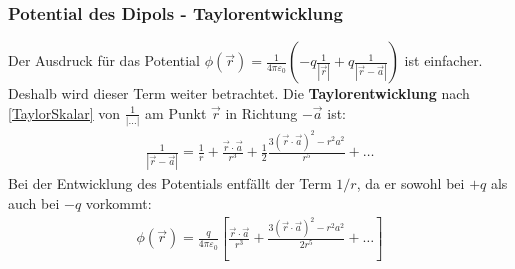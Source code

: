 	  \subsubsection{Potential des Dipols - Taylorentwicklung}
			  Der Ausdruck für das Potential $\phi (\vec{r} ) =  \frac{1}{4\pi\varepsilon_0} \left( -q\frac{1}{|\vec{r} |}  + q\frac{1}{|\vec{r} -\vec{a}|} \right)$ ist einfacher. Deshalb wird dieser Term weiter betrachtet.
			  Die \textbf{Taylorentwicklung} nach \ref{TaylorSkalar} von $\frac{1}{|\dots|}$ am Punkt $\vec{r} $ in Richtung $-\vec{a}$ ist:
			        \begin{equation}\label{Taylrrr}\begin{split}
					        \boxed{\frac{1}{|\vec{r} -\vec{a}|} = \frac{1}{r} + \frac{\vec{r} \cdot\vec{a}}{r^3} + \frac{1}{2} \frac{3(\vec{r} \cdot\vec{a})^2-r^2a^2}{r^5} + \ldots }
				        \end{split}\end{equation}
			  Bei der Entwicklung des Potentials entfällt der Term $1/r$, da er sowohl bei $+q$ als auch bei $-q$ vorkommt:
			        \begin{equation}\label{TaylorDip}\begin{split}
					        \phi (\vec{r} ) =  \frac{q}{4\pi\varepsilon_0} \left[ \frac{\vec{r} \cdot\vec{a}}{r^3} + \frac{3(\vec{r} \cdot\vec{a})^2-r^2a^2}{2r^5} + \ldots \right]
				        \end{split}\end{equation}
